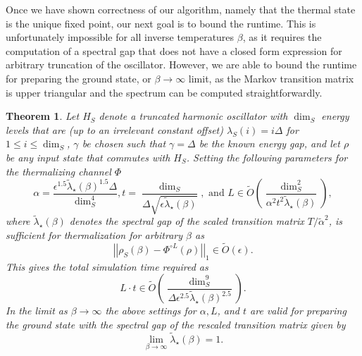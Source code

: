 \documentclass{article}
\newtheorem{theorem}{Theorem}
\newcommand{\norm}[1]{\left|\left| #1 \right|\right|}
\newcommand{\bigotilde}[1]{\widetilde{O} \left( #1 \right)}
\begin{document}
Once we have shown correctness of our algorithm, namely that the thermal state is the unique fixed point, our next goal is to bound the runtime. This is unfortunately impossible for all inverse temperatures $\beta$, as it requires the computation of a spectral gap that does not have a closed form expression for arbitrary truncation of the oscillator. However, we are able to bound the runtime for preparing the ground state, or $\beta \to \infty$ limit, as the Markov transition matrix is upper triangular and the spectrum can be computed straightforwardly.
\begin{theorem}\label{thm:harmonic_oscillator}
    Let $H_S$ denote a truncated harmonic oscillator with $\dim_S$ energy levels that are (up to an irrelevant constant offset) $\lambda_S(i) = i \Delta$ for $1 \le i \le \dim_S$, $\gamma$ be chosen such that $\gamma = \Delta$ be the known energy gap, and let $\rho$ be any input state that commutes with $H_S$. Setting the following parameters for the thermalizing channel $\Phi$
    \begin{equation}
        \alpha = \frac{\epsilon^{1.5} \widetilde{\lambda}_\star(\beta)^{1.5} \Delta}{\dim_S^4}, t = \frac{\dim_S}{\Delta \sqrt{\epsilon \widetilde{\lambda}_\star(\beta)}}, \text{ and } L \in \bigotilde{\frac{\dim_S^2}{\alpha^2 t^2 \widetilde{\lambda}_\star(\beta)}},
    \end{equation}
    where $\widetilde{\lambda}_\star(\beta)$ denotes the spectral gap of the scaled transition matrix $T / \widetilde{\alpha}^2$, is sufficient for thermalization for arbitrary $\beta$ as
    \begin{equation}
        \norm{\rho_S(\beta) - \Phi^{\circ L}(\rho)}_1 \in \bigotilde{\epsilon}.
    \end{equation}
    This gives the total simulation time required as
    \begin{equation}
        L \cdot t \in \bigotilde{\frac{\dim_S^9}{\Delta \epsilon^{2.5} \widetilde{\lambda}_\star(\beta)^{2.5}}}.
    \end{equation}
    In the limit as $\beta \to \infty$ the above settings for $\alpha, L$, and $t$ are valid for preparing the ground state with the spectral gap of the rescaled transition matrix given by
    \begin{equation}
        \lim_{\beta \to \infty} \widetilde{\lambda}_\star(\beta) = 1.
    \end{equation}
        

\end{theorem}
\end{document}
